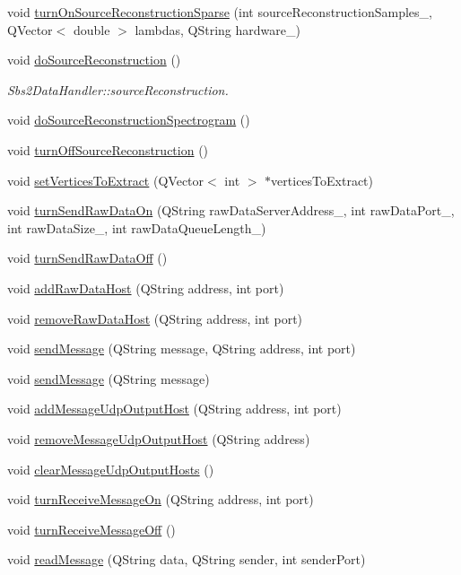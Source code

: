 \begin{DoxyCompactItemize}
void \hyperlink{classSbs2DataHandler_a7ac252a2df8b1bc0d8fb70ee4b6fc257}{turn\-On\-Source\-Reconstruction\-Sparse} (int source\-Reconstruction\-Samples\-\_\-, Q\-Vector$<$ double $>$ lambdas, Q\-String hardware\-\_\-)
\item 
void \hyperlink{classSbs2DataHandler_ad9d1f6e27668fca2c7de888a35e1d76b}{do\-Source\-Reconstruction} ()
\begin{DoxyCompactList}\small\item\em Sbs2\-Data\-Handler\-::source\-Reconstruction. \end{DoxyCompactList}\item 
void \hyperlink{classSbs2DataHandler_aed81e6f317b7a8d13c50a56d2a3d25f9}{do\-Source\-Reconstruction\-Spectrogram} ()
\item 
void \hyperlink{classSbs2DataHandler_a0d89acf0f3db95346a7a1766cc5d9e53}{turn\-Off\-Source\-Reconstruction} ()
\item 
void \hyperlink{classSbs2DataHandler_a08378afb0dc485b61e6dd3d8df4725b7}{set\-Vertices\-To\-Extract} (Q\-Vector$<$ int $>$ $\ast$vertices\-To\-Extract)
\item 
void \hyperlink{classSbs2DataHandler_a204bf82c68e7d8a4200fa9b29550c853}{turn\-Send\-Raw\-Data\-On} (Q\-String raw\-Data\-Server\-Address\-\_\-, int raw\-Data\-Port\-\_\-, int raw\-Data\-Size\-\_, int raw\-Data\-Queue\-Length\-\_)
\item 
void \hyperlink{classSbs2DataHandler_a2d141bc0fd854ab32d67c5bdc9d44e05}{turn\-Send\-Raw\-Data\-Off} ()
\item 
void \hyperlink{classSbs2DataHandler_a3298d5245f738010bb9bfed5ca62c239}{add\-Raw\-Data\-Host} (Q\-String address, int port)
\item 
void \hyperlink{classSbs2DataHandler_ab19470d4bd133e153ca1e0096c29ce5f}{remove\-Raw\-Data\-Host} (Q\-String address, int port)
\item 
void \hyperlink{classSbs2DataHandler_a114c012077c938b091d572727ae0907c}{send\-Message} (Q\-String message, Q\-String address, int port)
\item 
void \hyperlink{classSbs2DataHandler_aaa0ebc6aaf9d93cf5f0774159efea37b}{send\-Message} (Q\-String message)
\item 
void \hyperlink{classSbs2DataHandler_a712a80f3cd44f014d80736ef9cf8c3ee}{add\-Message\-Udp\-Output\-Host} (Q\-String address, int port)
\item 
void \hyperlink{classSbs2DataHandler_aa7ce95acbe8b3868b9878e1ed7a8ba8f}{remove\-Message\-Udp\-Output\-Host} (Q\-String address)
\item 
void \hyperlink{classSbs2DataHandler_a0059ed6e559e1dead35d68e0daf43d33}{clear\-Message\-Udp\-Output\-Hosts} ()
\item 
void \hyperlink{classSbs2DataHandler_af5103e49754f879ffdc9cd137d67b69b}{turn\-Receive\-Message\-On} (Q\-String address, int port)
\item 
void \hyperlink{classSbs2DataHandler_a94414da810f2947f3868308818c14b1e}{turn\-Receive\-Message\-Off} ()
\item 
void \hyperlink{classSbs2DataHandler_addfa29ebc759d1fb5c2bf39f2fc5064c}{read\-Message} (Q\-String data, Q\-String sender, int sender\-Port)
\end{DoxyCompactItemize}

